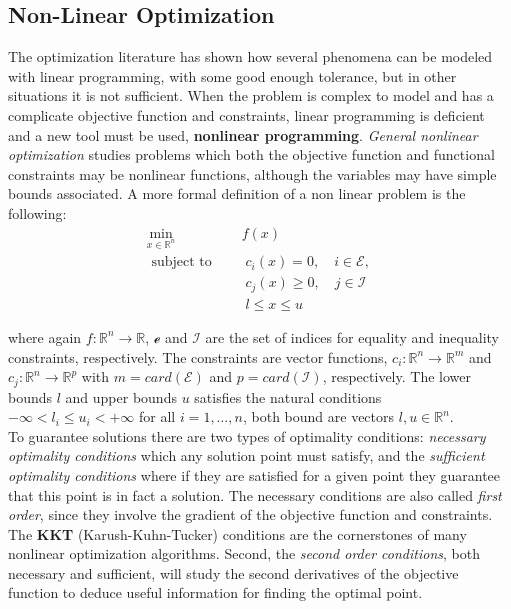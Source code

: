 \subsection{Non-Linear Optimization}

The optimization literature has shown how several phenomena can be modeled with linear programming, with some good enough tolerance, but in other situations it is not sufficient. When the problem is complex to model and has a complicate objective function and constraints, linear programming is deficient and a new tool must be used, \textbf{nonlinear programming}. \textit{General nonlinear optimization} studies problems which both the objective function and functional constraints may be nonlinear functions, although the variables may have simple bounds associated. A  more formal definition of a non linear problem is the following:
\begin{equation}\label{formal_general_opt}
\begin{aligned}
\underset{ x \in \mathbb{R}^n}{\text{min}} &\quad   f(x)\\
    \text { subject to }  & \quad  \;   c_i(x)=0, \quad i \in \mathcal{E} \text {, }\\
    & \quad  \; c_j(x) \geq 0, \quad j \in \mathcal{I}\\
    & \quad  \;  l \leq x \leq u
\end{aligned}
\end{equation}

where again $f:\mathbb{R}^n \to \mathbb{R}$, $\mathcal{e}$ and $\mathcal{I}$ are the set of indices for equality and inequality constraints, respectively. The constraints are vector functions, $c_i:\mathbb{R}^n \to \mathbb{R}^m $ and $c_j:\mathbb{R}^n \to \mathbb{R}^p $ with $m=card(\mathcal{E})$ and $p=card(\mathcal{I})$, respectively. The lower bounds $l$ and upper bounds $u$ satisfies the natural conditions $-\infty < l_i \leq u_i < + \infty$ for all $i=1,\dots, n$, both bound are vectors $l,u\in \mathbb{R}^n$.\\


To guarantee solutions there are two types of optimality conditions: \textit{necessary optimality conditions} which any solution point must satisfy, and the \textit{sufficient optimality conditions} where if they are satisfied for a given point they guarantee that this point is in fact a solution. The necessary conditions are also called \textit{first order}, since they involve the gradient of the objective function and constraints. The \textbf{KKT} (Karush-Kuhn-Tucker) conditions are the cornerstones of many nonlinear optimization algorithms. Second, the \textit{second order conditions}, both necessary and sufficient, will study the second derivatives of the objective function to deduce useful information for finding the optimal point.\cite{modern_optimization}
